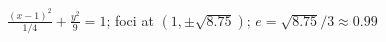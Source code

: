 {\begin{minipage}{\linewidth}\centering{}\end{minipage}}
{$\frac{(x-1)^2}{1/4}+\frac{y^2}{9}=1$; foci at $(1,\pm \sqrt{8.75})$; $e=\sqrt{8.75}/3\approx 0.99$
}

